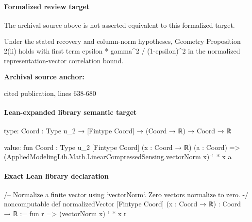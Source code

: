 \documentclass[10pt]{article}
\begin{document}
\paragraph{Formalized review target}
The archival source above is not asserted equivalent to this formalized target.
\begin{ReviewVerbatim}
Under the stated recovery and column-norm hypotheses, Geometry Proposition 2(ii) holds with first term epsilon * gamma^2 / (1-epsilon)^2 in the normalized representation-vector correlation bound.
\end{ReviewVerbatim}

\textbf{Archival source anchor:} {\footnotesize\raggedright cited publication, lines 638-\allowbreak{}680\par}
\paragraph{Lean-expanded library semantic target}
\begin{ReviewVerbatim}
type:
{Coord : Type u_2} → [Fintype Coord] → (Coord → ℝ) → Coord → ℝ

value:
fun {Coord : Type u_2} [Fintype Coord] (x : Coord → ℝ) (a : Coord) =>
  (AppliedModelingLib.Math.LinearCompressedSensing.vectorNorm x)⁻¹ * x a
\end{ReviewVerbatim}

\paragraph{Exact Lean library declaration}
\begin{ReviewVerbatim}
/-- Normalize a finite vector using `vectorNorm`. Zero vectors normalize to zero. -/
noncomputable def normalizedVector [Fintype Coord] (x : Coord → ℝ) : Coord → ℝ :=
  fun r => (vectorNorm x)⁻¹ * x r
\end{ReviewVerbatim}
\end{document}
